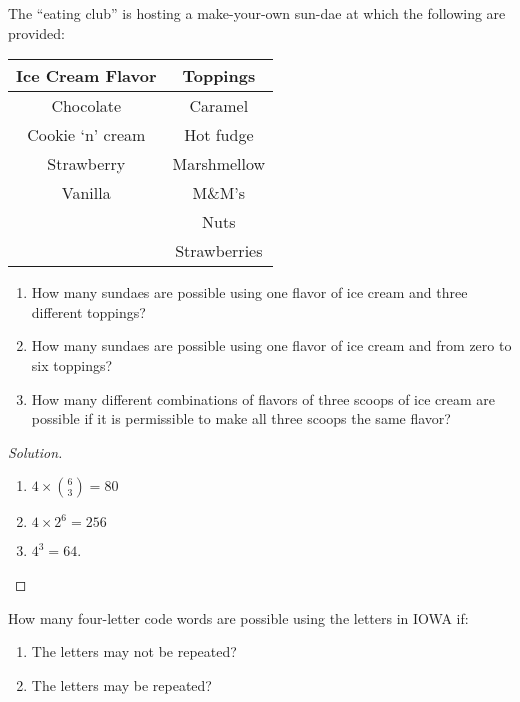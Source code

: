 \documentclass[class=probandstats,crop=false]{standalone}
\begin{document}
\begin{exercise}
    \par The ``eating club'' is hosting a make-your-own sun-dae at which the following are provided:
    \begin{table}[htp]
        \centering
        \begin{tabular}{c|c}
            \hline
            Ice Cream Flavor & Toppings     \\
            \hline
            Chocolate        & Caramel      \\
            Cookie `n' cream & Hot fudge    \\
            Strawberry       & Marshmellow  \\
            Vanilla          & M\&M's       \\
                             & Nuts         \\
                             & Strawberries \\
            \hline
        \end{tabular}
    \end{table}
    \begin{enumerate}[label = \textbf{(\alph*)}]
        \item How many sundaes are possible using one flavor of ice cream and three different toppings?
        \item How many sundaes are possible using one flavor of ice cream and from zero to six toppings?
        \item How many different combinations of flavors of three scoops of ice cream are possible if it is permissible to make all three scoops the same flavor?
    \end{enumerate}
\end{exercise}

\begin{proof}[Solution]
    \begin{enumerate}[label = \textbf{(\alph*)}]
        \item $4 \times \binom{6}{3} = 80$
        \item $4 \times 2^{6} = 256$
        \item $4^{3} = 64$.
    \end{enumerate}
\end{proof}

\begin{exercise}
    \par How many four-letter code words are possible using the letters in IOWA if:
    \begin{enumerate}[label = \textbf{(\alph*)}]
        \item The letters may not be repeated?
        \item The letters may be repeated?
    \end{enumerate}
\end{exercise}
\end{document}
